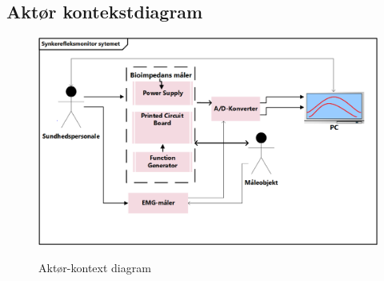 \subsection{Aktør kontekstdiagram}

\begin{figure}[H]
\centering
{\includegraphics[width=\textwidth]
{Figure/AktoerKontextDiagram}}
\caption{Aktør-kontext diagram}
\label{fig:sysbeskrivelse}
\end{figure}  

